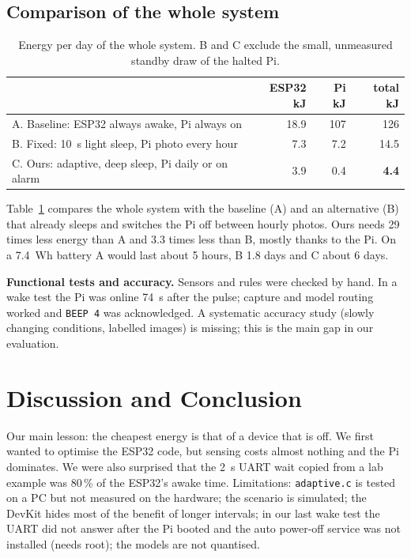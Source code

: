 \documentclass[runningheads]{llncs}
\begin{document}
\subsection{Comparison of the whole system}\label{sec:compare}
\begin{table}[t]
\centering
\caption{Energy per day of the whole system. B and C exclude the small, unmeasured standby draw of the halted Pi.}
\label{tab:system}
\setlength{\tabcolsep}{4pt}\small
\begin{tabular}{lrrr}
\toprule
 & ESP32 kJ & Pi kJ & total kJ\\
\midrule
A. Baseline: ESP32 always awake, Pi always on & 18.9 & 107 & 126\\
B. Fixed: \SI{10}{s} light sleep, Pi photo every hour & 7.3 & 7.2 & 14.5\\
C. Ours: adaptive, deep sleep, Pi daily or on alarm & 3.9 & 0.4 & \textbf{4.4}\\
\bottomrule
\end{tabular}
\end{table}

Table~\ref{tab:system} compares the whole system with the baseline (A) and an alternative (B) that already sleeps and switches the Pi off between hourly photos. Ours needs 29 times less energy than A and 3.3 times less than B, mostly thanks to the Pi. On a \SI{7.4}{Wh} battery A would last about 5 hours, B 1.8 days and C about 6 days.

\noindent\textbf{Functional tests and accuracy.} Sensors and rules were checked by hand. In a wake test the Pi was online \SI{74}{s} after the pulse; capture and model routing worked and \texttt{BEEP 4} was acknowledged. A systematic accuracy study (slowly changing conditions, labelled images) is missing; this is the main gap in our evaluation.

\section{Discussion and Conclusion}
Our main lesson: the cheapest energy is that of a device that is off. We first wanted to optimise the ESP32 code, but sensing costs almost nothing and the Pi dominates. We were also surprised that the \SI{2}{s} UART wait copied from a lab example was 80\,\% of the ESP32's awake time. Limitations: \texttt{adaptive.c} is tested on a PC but not measured on the hardware; the scenario is simulated; the DevKit hides most of the benefit of longer intervals; in our last wake test the UART did not answer after the Pi booted and the auto power-off service was not installed (needs root); the models are not quantised.
\end{document}
